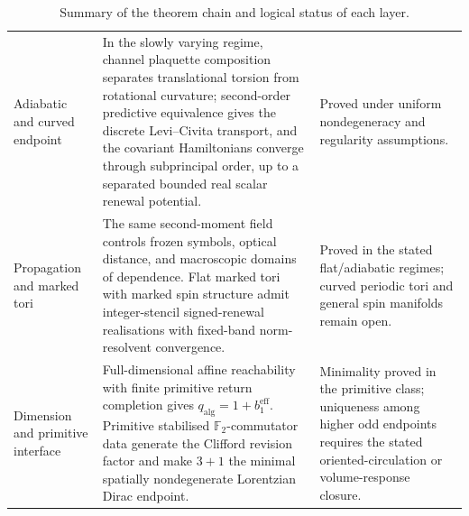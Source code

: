 \documentclass[11pt]{article}
\theoremstyle{definition}
\theoremstyle{remark}
\begin{document}
\begin{table}[t]
\begin{tabularx}{\textwidth}{%
  >{\raggedright\arraybackslash}p{}
  >{\raggedright\arraybackslash}X
  >{\raggedright\arraybackslash}p{}}
Adiabatic and curved endpoint &
In the slowly varying regime, channel plaquette composition separates
translational torsion from rotational curvature; second-order predictive
equivalence gives the discrete Levi--Civita transport, and the covariant
Hamiltonians converge through subprincipal order, up to a separated bounded real
scalar renewal potential. &
Proved under uniform nondegeneracy and regularity assumptions. \\[3pt]

Propagation and marked tori &
The same second-moment field controls frozen symbols, optical distance, and
macroscopic domains of dependence.  Flat marked tori with marked spin structure
admit integer-stencil signed-renewal realisations with fixed-band norm-resolvent
convergence. &
Proved in the stated flat/adiabatic regimes; curved periodic tori and general
spin manifolds remain open. \\[3pt]

Dimension and primitive interface &
Full-dimensional affine reachability with finite primitive return completion
gives \(q_{\mathrm{alg}}=1+b_1^{\mathrm{eff}}\).  Primitive stabilised
\(\mathbb F_2\)-commutator data generate the Clifford revision factor and make
\(3+1\) the minimal spatially nondegenerate Lorentzian Dirac endpoint. &
Minimality proved in the primitive class; uniqueness among higher odd endpoints
requires the stated oriented-circulation or volume-response closure. \\

\bottomrule
\end{tabularx}
\caption{Summary of the theorem chain and logical status of each layer.}
\label{tab:theorem-chain}
\end{table}


 

\end{document}
